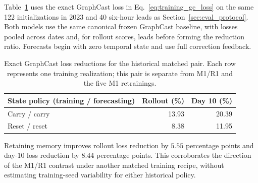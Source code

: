 \documentclass{article}
\newcommand{\vfourchange}[1]{{\color{blue}#1}}
\begin{document}
\vfourchange{Table~\ref{tab:historical_memory} uses the exact GraphCast loss in Eq.~\eqref{eq:training_gc_loss} on the same 122 initializations in 2023 and 40 six-hour leads as Section~\ref{sec:eval_protocol}. Both models use the same canonical frozen GraphCast baseline, with losses pooled across dates and, for rollout scores, leads before forming the reduction ratio. Forecasts begin with zero temporal state and use full correction feedback.}

\begin{table}[!htbp]
    \centering
    \begingroup\color{blue}
    \begin{tabular}{lrr}
        \toprule
        State policy (training / forecasting) & Rollout (\%) & Day 10 (\%) \\
        \midrule
        Carry / carry & 13.93 & 20.39 \\
        Reset / reset & 8.38 & 11.95 \\
        \bottomrule
    \end{tabular}
    \endgroup
    \caption{\vfourchange{Exact GraphCast loss reductions for the historical matched pair. Each row represents one training realization; this pair is separate from M1/R1 and the five M1 retrainings.}}
    \label{tab:historical_memory}
\end{table}

\vfourchange{Retaining memory improves rollout loss reduction by $5.55$ percentage points and day-10 loss reduction by $8.44$ percentage points. This corroborates the direction of the M1/R1 contrast under another matched training recipe, without estimating training-seed variability for either historical policy.}
\end{document}
